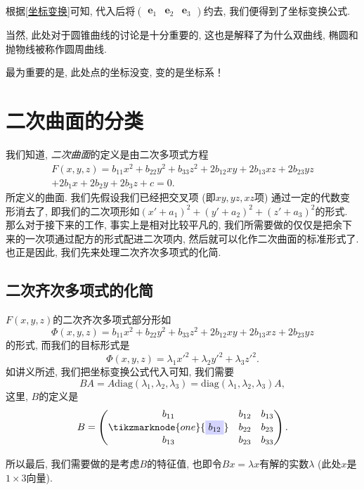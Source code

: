 \documentclass[./main.tex]{subfiles}
\begin{document}
根据\eqref{坐标变换}可知, 代入后将$\begin{pmatrix}\mathbf{e}_1&\mathbf{e}_2&\mathbf{e}_3\end{pmatrix}$约去, 我们便得到了坐标变换公式. 

当然, 此处对于圆锥曲线的讨论是十分重要的, 这也是解释了为什么双曲线, 椭圆和抛物线被称作圆周曲线. 

最为重要的是, 此处点的坐标没变, 变的是坐标系！
\section{二次曲面的分类}

我们知道, \textit{二次曲面}的定义是由二次多项式方程
\begin{multline*}
    F(x,y,z)=b_{11}x^2+b_{22}y^2+b_{33}z^2+2b_{12}xy+
2b_{13}xz+2b_{23}yz\\
+2b_1x+2b_2y+2b_3z+c=0.
\end{multline*}
所定义的曲面. 我们先假设我们已经把交叉项 (即$xy,yz,xz$项) 通过一定的代数变形消去了, 
即我们的二次项形如$(x'+a_1)^2+(y'+a_2)^2+(z'+a_3)^2$的形式. 
那么对于接下来的工作, 事实上是相对比较平凡的, 我们所需要做的仅仅是把余下来的一次项通过配方的形式配进二次项内, 然后就可以化作二次曲面的标准形式了. 也正是因此, 我们先来处理二次齐次多项式的化简. 
\subsection{二次齐次多项式的化简}
$F(x,y,z)$的二次齐次多项式部分形如
\begin{equation*}
\Phi(x,y,z)=b_{11}x^2+b_{22}y^2+b_{33}z^2+2b_{12}xy+
2b_{13}xz+2b_{23}yz
\end{equation*}
的形式, 而我们的目标形式是
\begin{equation}\label{标准形式}
\Phi(x,y,z)=\lambda_1x'^2+\lambda_2y'^2+\lambda_3z'^2.
\end{equation}
如讲义所述, 我们把坐标变换公式代入可知, 我们需要
\[
BA=A\text{diag}(\lambda_1,\lambda_2,\lambda_3)=\text{diag}(\lambda_1,\lambda_2,\lambda_3)A,
\]
这里, $B$的定义是
\[B=
\begin{pmatrix}
b_{11}&b_{12}&b_{13}\\
\tikzmarknode{one}{\highlight{blue}{b_{12}}}&b_{22}&b_{23}\\
b_{13}&b_{23}&b_{33}\\
\end{pmatrix}.
\]
所以最后, 我们需要做的是考虑$B$的特征值, 也即令$Bx=\lambda x$有解的实数$\lambda$ (此处$x$是$1\times3$向量).
\end{document}
